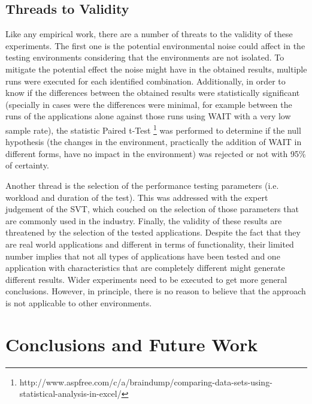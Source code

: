 \documentclass[runningheads,a4paper]{llncs}
\begin{document}
\subsection{Threads to Validity}

Like any empirical work, there are a number of threats to the validity of these
experiments. The first one is the potential environmental noise could affect in
the testing environments considering that the environments are not isolated. To
mitigate the potential effect the noise might have in the obtained results, multiple runs 
were executed for each identified combination. Additionally, in order to know if
the differences between the obtained results were statistically significant (specially in cases 
were the differences were minimal, for example between the runs of the
applications alone against those runs using WAIT with a very low sample rate), the statistic Paired t-Test
\footnote{http://www.aspfree.com/c/a/braindump/comparing-data-sets-using-statistical-analysis-in-excel/}
was performed to determine if the null hypothesis (the changes in the
environment, practically the addition of WAIT in different forms, have no
impact in the environment) was rejected or not with 95\% of certainty.

Another thread is the selection of the performance testing parameters (i.e.
workload and duration of the test). This was addressed with the expert judgement 
of the SVT, which couched on the selection of those parameters that are
commonly used in the industry. Finally, the validity of these results are
threatened by the selection of the tested applications. Despite the fact that
they are real world applications and different in terms of functionality, their
limited number implies that not all types of applications have been tested and
one application with characteristics that are completely different might
generate different results. Wider experiments need to be executed to get more
general conclusions. However, in principle, there is no reason to believe that
the approach is not applicable to other environments.



\section{Conclusions and Future Work}
\end{document}
